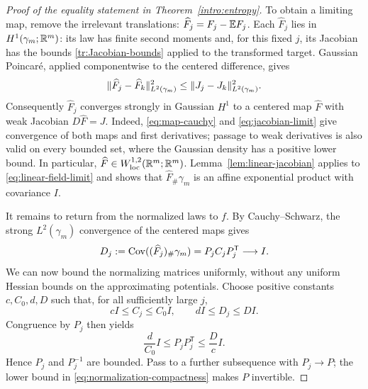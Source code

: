 \begin{proof}[Proof of the equality statement in Theorem~\ref{intro:entropy}]
To obtain a limiting map, remove the irrelevant translations:
$\widehat F_j=F_j-\mathbb E F_j$.  Each $\widehat F_j$ lies in
$H^1(\gamma_m;\mathbb R^m)$: its law has finite second moments and, for this
fixed $j$, its Jacobian has the bounds \eqref{tr:Jacobian-bounds}
applied to the transformed target.  Gaussian Poincar\'e, applied
componentwise to the centered difference, gives
\begin{equation}\label{eq:map-cauchy}
  \lVert \widehat F_j-\widehat F_k\rVert_{L^2(\gamma_m)}^2
    \le \lVert J_j-J_k\rVert_{L^2(\gamma_m)}^2.
\end{equation}
Consequently $\widehat F_j$ converges strongly in Gaussian $H^1$ to a
centered map $\widehat F$ with weak Jacobian $D\widehat F=J$.
Indeed, \eqref{eq:map-cauchy} and \eqref{eq:jacobian-limit} give
convergence of both maps and first derivatives; passage to weak
derivatives is also valid on every bounded set, where the Gaussian
density has a positive lower bound.  In particular,
$\widehat F\in W^{1,2}_{\mathrm{loc}}(\mathbb R^m;\mathbb R^m)$.
Lemma~\ref{lem:linear-jacobian} applies to \eqref{eq:linear-field-limit}
and shows that $\widehat F_\#\gamma_m$ is an affine exponential product
with covariance $I$.

It remains to return from the normalized laws to $f$.
By Cauchy--Schwarz, the strong $L^2(\gamma_m)$ convergence of the
centered maps gives
\begin{equation}\label{eq:normalized-covariance-limit}
  D_j:=\operatorname{Cov}((\widehat F_j)_\#\gamma_m)
      =P_jC_jP_j^{\mathsf T}\longrightarrow I.
\end{equation}
We can now bound the normalizing matrices uniformly, without any
uniform Hessian bounds on the approximating potentials.
Choose positive constants $c,C_0,d,D$ such that, for all sufficiently
large $j$,
\[
  cI\le C_j\le C_0I,\qquad dI\le D_j\le DI.
\]
Congruence by $P_j$ then yields
\begin{equation}\label{eq:normalization-compactness}
  \frac d{C_0}I\le P_jP_j^{\mathsf T}\le\frac Dc I.
\end{equation}
Hence $P_j$ and $P_j^{-1}$ are bounded.  Pass to a further subsequence
with $P_j\to P$; the lower bound in
\eqref{eq:normalization-compactness} makes $P$ invertible.


\end{proof}
